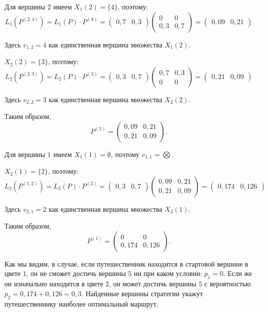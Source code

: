 \par Для вершины $2$ имеем $X_1(2) = \{4\}$, поэтому: 
\[L_1(P^{(2, 4)}) = L_1(P) \cdot P^{(4)} = \begin{pmatrix} 0,7 & 0,3 \end{pmatrix} \begin{pmatrix} 0 & 0\\ 0,3 & 0,7 \end{pmatrix} = \begin{pmatrix} 0,09 & 0,21 \end{pmatrix} \]
\par Здесь $v_{1, 2} = 4$ как единственная вершина множества $X_1(2)$.
\par $X_2(2) = \{3\}$, поэтому: 
\[L_2(P^{(2, 3)}) = L_2(P) \cdot P^{(3)} = \begin{pmatrix} 0,3 & 0,7 \end{pmatrix} \begin{pmatrix} 0,7 & 0,3\\ 0 & 0 \end{pmatrix} = \begin{pmatrix} 0,21 & 0,09 \end{pmatrix} \]
\par Здесь $v_{2, 2} = 3$ как единственная вершина множества $X_2(2)$.
\par Таким образом, 
\[
P^{(2)} = \begin{pmatrix} 0,09 & 0,21\\ 0,21 & 0,09 \end{pmatrix}.
\]

\par Для вершины $1$ имеем $X_1(1) = \emptyset$, поэтому $v_{1, 1} = \bigotimes$.
\par $X_2(1) = \{2\}$, поэтому: 
\[L_2(P^{(1, 2)}) = L_2(P) \cdot P^{(2)} = \begin{pmatrix} 0,3 & 0,7 \end{pmatrix} \begin{pmatrix} 0,09 & 0,21\\ 0,21 & 0,09 \end{pmatrix} = \begin{pmatrix} 0,174 & 0,126 \end{pmatrix} \]
\par Здесь $v_{2, 1} = 2$ как единственная вершина множества $X_2(1)$.
\par Таким образом, 
\[
P^{(1)} = \begin{pmatrix} 0 & 0\\ 0,174 & 0,126 \end{pmatrix}.
\]
\par Как мы видим, в случае, если путешественник находится в стартовой вершине в цвете $1$, он не сможет достичь вершины $5$ ни при каком условии: $p_1 = 0$. Если же он изначально находится в цвете $2$, он может достичь вершины $5$ с вероятностью $p_2 = 0,174 + 0,126 = 0,3$. Найденные вершины стратегии укажут путешественнику наиболее оптимальный маршрут.